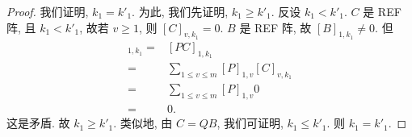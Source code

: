 \documentclass[../libro.tex]{subfiles}
\begin{document}
\begin{proof}
    我们证明, \(k_1 = k'_1\).
    为此, 我们先证明, \(k_1 \geq k'_1\).
    反设 \(k_1 < k'_1\).
    \(C\) 是 REF 阵, 且 \(k_1 < k'_1\),
    故若 \(v \geq 1\), 则 \([C]_{v,k_1} = 0\).
    \(B\) 是 REF 阵, 故 \([B]_{1,k_1} \neq 0\).
    但
    \begin{align*}
        [B]_{1,k_1}
        = {} &
        [P C]_{1,k_1}
        \\
        = {} &
        \sum_{1 \leq v \leq m} {[P]_{1,v} [C]_{v,k_1}}
        \\
        = {} &
        \sum_{1 \leq v \leq m} {[P]_{1,v} 0}
        \\
        = {} &
        0.
    \end{align*}
    这是矛盾.
    故 \(k_1 \geq k'_1\).
    类似地, 由 \(C = Q B\),
    我们可证明, \(k_1 \leq k'_1\).
    则 \(k_1 = k'_1\).


\end{proof}
\end{document}
